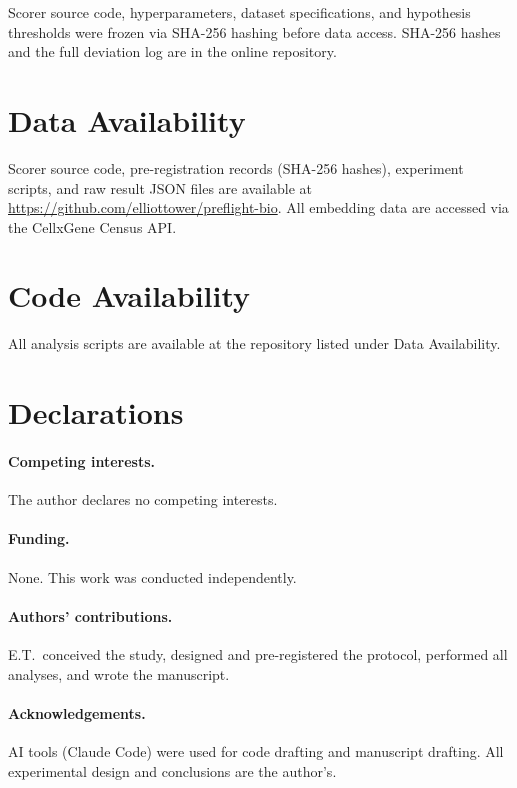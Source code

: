\documentclass[11pt]{article}
\begin{document}
Scorer source code, hyperparameters, dataset specifications, and
hypothesis thresholds were frozen via SHA-256 hashing before data
access. SHA-256 hashes and the full deviation log are in the online
repository.


\section*{Data Availability}

Scorer source code, pre-registration records (SHA-256 hashes),
experiment scripts, and raw result JSON files are available at
\url{https://github.com/elliottower/preflight-bio}. All embedding data
are accessed via the CellxGene Census API.

\section*{Code Availability}

All analysis scripts are available at the repository listed under Data
Availability.

\section*{Declarations}

\paragraph{Competing interests.} The author declares no competing
interests.

\paragraph{Funding.} None. This work was conducted independently.

\paragraph{Authors' contributions.} E.T.\ conceived the study,
designed and pre-registered the protocol, performed all analyses, and
wrote the manuscript.

\paragraph{Acknowledgements.} AI tools (Claude Code) were used for code
drafting and manuscript drafting. All experimental design and conclusions
are the author's.
\end{document}

